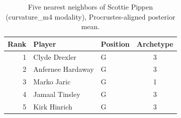 \begin{table}[htbp]
  \centering\small
  \begin{tabular}{rllc}
    \toprule
    Rank & Player & Position & Archetype \\
    \midrule
    1 & Clyde Drexler & G & 3 \\
    2 & Anfernee Hardaway & G & 3 \\
    3 & Marko Jaric & G & 1 \\
    4 & Jamaal Tinsley & G & 3 \\
    5 & Kirk Hinrich & G & 3 \\
    \bottomrule
  \end{tabular}
  \caption{Five nearest neighbors of Scottie Pippen (curvature_m4 modality), Procrustes-aligned posterior mean.}
  \label{tab:Scottie_Pippen_neighbors_curvature_m4}
\end{table}

